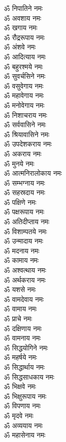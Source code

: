 \begin{multicols}{2}
\begin{flushleft}
ॐ निपातिने नमः\\
ॐ अवशाय नमः\\
ॐ खगाय नमः\\
ॐ रौद्ररूपाय नमः\\
ॐ अंशवे नमः\hfill{}\\
ॐ आदित्याय नमः\\
ॐ बहुरश्मये नमः\\
ॐ सुवर्चसिने नमः\\
ॐ वसुवेगाय नमः\\
ॐ महावेगाय नमः\\
ॐ मनोवेगाय नमः\\
ॐ निशाचराय नमः\\
ॐ सर्ववासिने नमः\\
ॐ श्रियावासिने नमः\\
ॐ उपदेशकराय नमः\hfill{}\\
ॐ अकराय नमः\\
ॐ मुनये नमः\\
ॐ आत्मनिरालोकाय नमः\\
ॐ सम्भग्नाय नमः\\
ॐ सहस्रदाय नमः\\
ॐ पक्षिणे नमः\\
ॐ पक्षरूपाय नमः\\
ॐ अतिदीप्ताय नमः\\
ॐ विशाम्पतये नमः\\
ॐ उन्मादाय नमः\hfill{}\\
ॐ मदनाय नमः\\
ॐ कामाय नमः\\
ॐ अश्वत्थाय नमः\\
ॐ अर्थकराय नमः\\
ॐ यशसे नमः\\
ॐ वामदेवाय नमः\\
ॐ वामाय नमः\\
ॐ प्राचे नमः\\
ॐ दक्षिणाय नमः\\
ॐ वामनाय नमः\hfill{}\\
ॐ सिद्धयोगिने नमः\\
ॐ महर्षये नमः\\
ॐ सिद्धार्थाय नमः\\
ॐ सिद्धसाधकाय नमः\\
ॐ भिक्षवे नमः\\
ॐ भिक्षुरूपाय नमः\\
ॐ विपणाय नमः\\
ॐ मृदवे नमः\\
ॐ अव्ययाय नमः\\
ॐ महासेनाय नमः\hfill{}\\

\end{flushleft}
\end{multicols}
